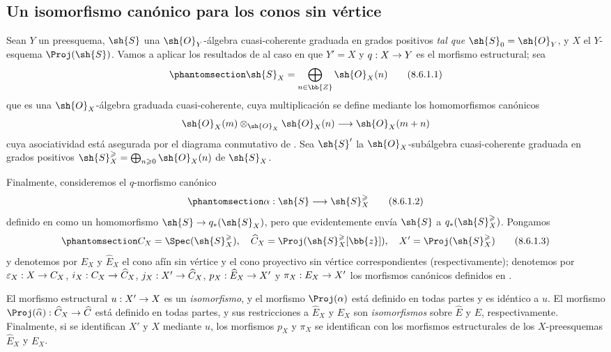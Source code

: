 \documentclass[oneside,10pt]{amsart}
\makeatletter
\renewcommand{\geq}{\geqslant}
\newcommand{\ega@arrow}[2]{\mathchoice{#1}{#2}{#2}{#2}}
\renewcommand{\to}{\ega@arrow{\longrightarrow}{\rightarrow}}
\newcommand{\oldpage}[2][]{\marginnote{\normalfont\footnotesize\textbf{#1}~|~#2}\ignorespaces}
\let\EGAOriginalLabel\label
\renewcommand{\label}[1]{\phantomsection\EGAOriginalLabel{#1}}
\makeatother
\begin{document}
\subsection{Un isomorfismo canónico para los conos sin vértice}
\label{subsection:II.8.6}

\begin{env}[8.6.1]
\label{II.8.6.1}
Sean $Y$ un preesquema, $\sh{S}$ una $\sh{O}_Y$-álgebra cuasi-coherente graduada en grados positivos \emph{tal que $\sh{S}_0=\sh{O}_Y$}, y $X$ el $Y$-esquema $\Proj(\sh{S})$.
Vamos a aplicar los resultados de  al caso en que $Y'=X$ y $q:X\to Y$ es el morfismo estructural;
sea
\[
\label{II.8.6.1.1}
  \sh{S}_X=\bigoplus_{n\in\bb{Z}}\sh{O}_X(n)
  \tag{8.6.1.1}
\]
\oldpage[II]{172}
que es una $\sh{O}_X$-álgebra graduada cuasi-coherente, cuya multiplicación se define mediante los homomorfismos canónicos 
\[
  \sh{O}_X(m)\otimes_{\sh{O}_X}\sh{O}_X(n)\to\sh{O}_X(m+n)
\]
cuya asociatividad está asegurada por el diagrama conmutativo de .
Sea $\sh{S}'$ la $\sh{O}_X$-subálgebra cuasi-coherente graduada en grados positivos $\sh{S}_X^\geq=\bigoplus_{n\geq0}\sh{O}_X(n)$ de $\sh{S}_X$.

Finalmente, consideremos el $q$-morfismo canónico
\[
\label{II.8.6.1.2}
  \alpha: \sh{S} \to \sh{S}_X^\geq
\tag{8.6.1.2}
\]
definido en  como un homomorfismo $\sh{S}\to q_*(\sh{S}_X)$, pero que evidentemente envía $\sh{S}$ a $q_*(\sh{S}_X^\geq)$.
Pongamos
\[
\label{II.8.6.1.3}
  C_X = \Spec(\sh{S}_X^\geq),
  \quad
  \widehat{C}_X = \Proj(\sh{S}_X^\geq[\bb{z}]),
  \quad
  X' = \Proj(\sh{S}_X^\geq)
\tag{8.6.1.3}
\]
y denotemos por $E_X$ y $\widehat{E}_X$ el cono afín sin vértice y el cono proyectivo sin vértice correspondientes (respectivamente);
denotemos por $\varepsilon_X:X\to C_X$, $i_X:C_X\to\widehat{C}_X$, $j_X:X'\to\widehat{C}_X$, $p_X:\widehat{E}_X\to X'$ y $\pi_X:E_X\to X'$ los morfismos canónicos definidos en .
\end{env}
\begin{proposition}[8.6.2]
\label{II.8.6.2}
El morfismo estructural $u:X'\to X$ es un \emph{isomorfismo}, y el morfismo $\Proj(\alpha)$ está definido en todas partes y es idéntico a $u$.
El morfismo $\Proj(\widehat{\alpha}):\widehat{C}_X\to\widehat{C}$ está definido en todas partes, y sus restricciones a $\widehat{E}_X$ y $E_X$ son \emph{isomorfismos} sobre $\widehat{E}$ y $E$, respectivamente.
Finalmente, si se identifican $X'$ y $X$ mediante $u$, los morfismos $p_X$ y $\pi_X$ se identifican con los morfismos estructurales de los $X$-preesquemas $\widehat{E}_X$ y $E_X$.
\end{proposition}
\end{document}
